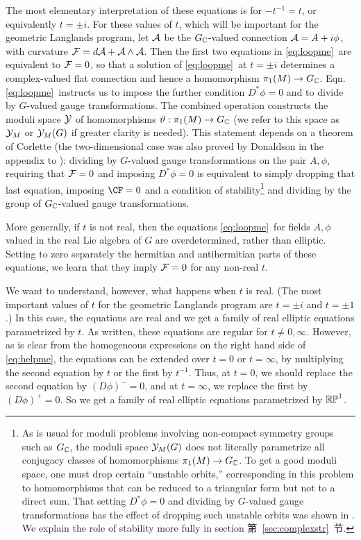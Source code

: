  The most elementary interpretation of these equations is
for $-t^{-1}=t$, or equivalently $t=\pm i$.  For these values of
$t$, which will be important for the geometric Langlands program,
let ${\cal A}$ be the ${G}_{\Bbb{C}}$-valued connection ${\cal
A}=A+i\phi$, with curvature ${\cal F}=d{\cal A}+{\cal A}\wedge
{\cal A}$.  Then the first two equations in \eqref{eq:loopme}\ are
equivalent to ${\cal F}=0$, so that a solution of \eqref{eq:loopme}\ at
$t=\pm i$ determines a complex-valued flat connection and hence a
 homomorphism $\pi_1(M)\to G_{{\Bbb{C}}}$. Eqn. \eqref{eq:loopme}\ instructs
us to impose the further condition $D^*\phi=0$ and to divide by
$G$-valued gauge transformations. The combined operation
constructs the moduli space ${\cal Y}$ of homomorphisms
$\vartheta:\pi_1(M)\to {{{G}}}_{\Bbb{C}}$ (we refer to this space
as ${\cal Y}_M$ or ${\cal Y}_M(G)$ if greater clarity is needed).
This statement depends on a theorem of Corlette \cite{ref58} (the two-dimensional case was also
proved by Donaldson in the appendix to \cite{ref20}): dividing by
$G$-valued gauge transformations on the pair $A,\phi$, requiring
that ${\cal F}=0$ and imposing $D^*\phi=0$ is equivalent to simply
dropping that last equation, imposing $\CF=0$ and a condition of
stability\footnote{ As is usual for moduli problems involving
non-compact symmetry groups such as $G_{\Bbb{C}}$, the moduli
space ${\cal Y}_M(G)$ does not literally parametrize all conjugacy
classes of homomorphisms $\pi_1(M)\to G_{\Bbb{C}}$. To get a good
moduli space, one must drop certain ``unstable orbits,''
corresponding in this problem to homomorphisms that can be reduced
to a triangular form but not to a direct sum.  That setting $D^*
\phi=0$ and dividing by $G$-valued gauge transformations has the
effect of dropping such unstable orbits was shown in \cite{ref58}.
We explain the role of stability  more fully in section
第~\ref{sec:complexstr}~节.} and dividing by the group of $G_{\Bbb{C}}$-valued
gauge transformations.

More generally, if $t$ is not real, then the equations \eqref{eq:loopme}\
for fields $A,\phi$ valued in the real Lie algebra of $G$ are
overdetermined, rather than elliptic.  Setting to zero separately
the hermitian and antihermitian parts of these equations, we learn
that they imply ${\cal F}=0$ for any non-real $t$.

We want to understand, however, what happens when $t$ is real.
(The most important values of $t$ for the geometric Langlands
program are $t=\pm i$ and $t=\pm 1$.) In this case, the equations
are real and we get a family of real elliptic equations
parametrized by $t$.  As written, these equations are regular for
$t\not= 0,\infty$.  However, as is clear from the homogeneous
expressions on the right hand side of \eqref{eq:helpme}, the equations can
be extended over $t=0$ or $t=\infty$, by multiplying the second
equation by $t$ or the first by $t^{-1}$.  Thus, at $t=0$, we
should replace the second equation by $(D\phi)^-=0$, and at
$t=\infty$, we replace the first by $(D\phi)^+=0$.  So we get a
family of real elliptic equations parametrized by $\Bbb{RP}^1$.

